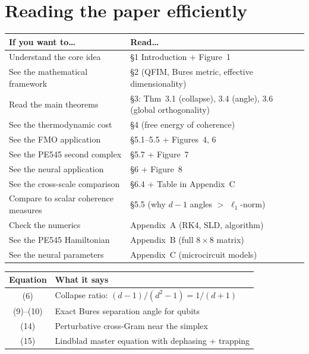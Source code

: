 \documentclass[11pt,a4paper]{article}
\begin{document}
\section*{Reading the paper efficiently}

\begin{table}[ht]
\centering
\begin{tabular}{@{}p{}p{}@{}}
\toprule
\textbf{If you want to\ldots} & \textbf{Read\ldots} \\
\midrule
Understand the core idea & \S1 Introduction + Figure~1 \\
See the mathematical framework & \S2 (QFIM, Bures metric, effective dimensionality) \\
Read the main theorems & \S3: Thm~3.1 (collapse), 3.4 (angle), 3.6 (global orthogonality) \\
See the thermodynamic cost & \S4 (free energy of coherence) \\
See the FMO application & \S5.1--5.5 + Figures~4, 6 \\
See the PE545 second complex & \S5.7 + Figure~7 \\
See the neural application & \S6 + Figure~8 \\
See the cross-scale comparison & \S6.4 + Table in Appendix~C \\
Compare to scalar coherence measures & \S5.5 (why $d{-}1$ angles $>$ $\ell_1$-norm) \\
Check the numerics & Appendix~A (RK4, SLD, algorithm) \\
See the PE545 Hamiltonian & Appendix~B (full $8\times 8$ matrix) \\
See the neural parameters & Appendix~C (microcircuit models) \\
\bottomrule
\end{tabular}
\end{table}

\begin{table}[ht]
\centering
\begin{tabular}{@{}cp{}@{}}
\toprule
\textbf{Equation} & \textbf{What it says} \\
\midrule
(6) & Collapse ratio: $(d{-}1)/(d^2{-}1) = 1/(d{+}1)$ \\
(9)--(10) & Exact Bures separation angle for qubits \\
(14) & Perturbative cross-Gram near the simplex \\
(15) & Lindblad master equation with dephasing + trapping \\
\bottomrule
\end{tabular}
\end{table}
\end{document}
